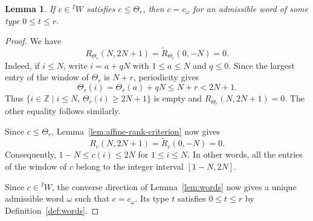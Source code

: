 \documentclass[11pt,a4paper,reqno]{amsart}
\numberwithin{equation}{section}
\newtheorem{lemma}[theorem]{Lemma}
\theoremstyle{definition}
\theoremstyle{remark}
\theoremstyle{plain}
\newcommand{\Z}{\mathbb Z}
\begin{document}
\begin{lemma}\label{lem:word-ideal}
If $c\in{}^I W$ satisfies $c\leq\Theta_r$, then $c=c_\omega$
for an admissible word of some type $0\leq t\leq r$.
\end{lemma}
\begin{proof}
We have
\[
 R_{\Theta_r}(N,2N+1)=\widetilde R_{\Theta_r}(0,-N)=0.
\]
Indeed, if $i\leq N$, write $i=a+qN$ with
$1\leq a\leq N$ and $q\leq0$. Since the largest entry of
the window of $\Theta_r$ is $N+r$, periodicity gives
\[
 \Theta_r(i)=\Theta_r(a)+qN\leq N+r<2N+1.
\]
Thus  $\{ i \in \Z \mid i\leq N, \,\Theta_r(i)\geq 2N+1 \}$ is empty and   $R_{\Theta_r}(N,2N+1)=0$.
The other equality follows similarly.



Since $c\leq\Theta_r$,
Lemma~\ref{lem:affine-rank-criterion} now gives
\[
 R_c(N,2N+1)=\widetilde R_c(0,-N)=0.
\]
Consequently, $1-N\leq c(i)\leq 2N$ for $1\leq i\leq N$.
In other words, all the entries of the window of $c$ belong to the integer interval $[1-N,2N]$.


Since $c\in{}^IW$, the converse direction of Lemma~\ref{lem:words}
now gives a unique admissible word $\omega$ such that $c=c_\omega$.
Its type $t$ satisfies $0\leq t\leq r$ by Definition~\ref{def:words}.
\end{proof}
\end{document}
